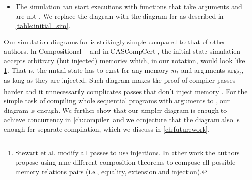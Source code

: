 \begin{itemize}
We further expand the notion of  at the end of this subsection.

\begin{figure}\centering
\begin{multicols}{2}
$$m_s \overset{j'}{\hookrightarrow} m_t$$
$$args_{s} \overset{j'}{\hookrightarrow} args_{t}$$
\columnbreak
{}
\end{multicols}

\caption[New entry point diagram]{Diagram for initial states with injected initial memories and arguments. Given an entry point in the source, for any target memory $m_t$ and arguments $\text{args}_t$, that are related to the source by an injection, there exists an entry point for the targert with those arguments. The new source state is related to the target one by the $\sim$ relation.}\label{fig:inj_initial_diagram}
\end{figure}

\item The simulation can start executions with functions that take arguments and are not . We replace the  diagram with  the diagram for  as described in \cref{table:initial_sim}.

\end{itemize}


Our  simulation diagrams for  is strikingly simple compared to that of other authors. In Compositional \compcert\ \cite{compcomp} and in CASCompCert \cite{jiang14:pldi}, the initial state simulation accepts arbitrary (but injected) memories which, in our notation, would look like \ref{fig:inj_initial_diagram}. That is, the initial state has to exist for any memory $m_t$ and arguments $\text{args}_t$, as long as they are injected. 
Such diagram makes the proof of compiler passes harder and it unnecessarily complicates passes that don't inject memory\footnote{Stewart et al.\cite{compcomp} modify all passes to use injections. In other work \cite{bsda:esop2014} the authors propose using nine different composition theorems to compose all possible memory relations pairs (i.e., equality, extension and injection).}. For the simple task of compiling whole sequential programs with arguments to \main, our diagram is enough. We further show that our simpler diagram is enough to achieve concurrency in \cref{ch:compiler} and we conjecture that the diagram also is enough for separate compilation, which we discuss in  \cref{ch:futurework}.



